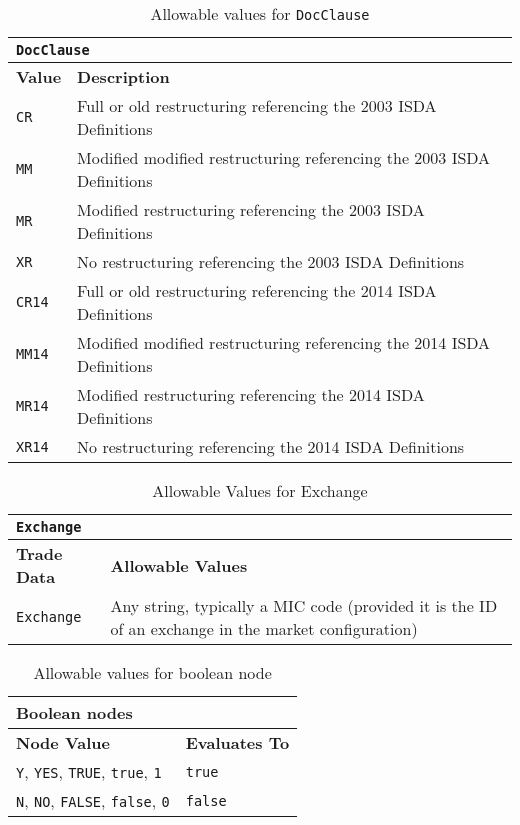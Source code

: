 \begin{table}[H]
\centering
  \begin{tabular} {|p{3cm}|p{12cm}|}
    \hline
    \multicolumn{2}{|l|}{\lstinline!DocClause!} \\
    \hline
    \textbf{Value} & \textbf{Description} \\
    \hline
    \lstinline!CR! & Full or old restructuring referencing the 2003 ISDA Definitions \\
    \hline
    \lstinline!MM! & Modified modified restructuring referencing the 2003 ISDA Definitions \\
    \hline
    \lstinline!MR! & Modified restructuring referencing the 2003 ISDA Definitions \\
    \hline
    \lstinline!XR! & No restructuring referencing the 2003 ISDA Definitions \\
    \hline
    \lstinline!CR14! & Full or old restructuring referencing the 2014 ISDA Definitions \\
    \hline
    \lstinline!MM14! & Modified modified restructuring referencing the 2014 ISDA Definitions \\
    \hline
    \lstinline!MR14! & Modified restructuring referencing the 2014 ISDA Definitions \\
    \hline
    \lstinline!XR14! & No restructuring referencing the 2014 ISDA Definitions \\
    \hline
  \end{tabular}
  \caption{Allowable values for \lstinline!DocClause!}
  \label{tab:docclause_data}
\end{table}

\begin{table}[H]
\centering
  \begin{tabular} {|p{3cm}|p{12cm}|}
    \hline
    \multicolumn{2}{|l|}{\tt Exchange} \\ \hline
    \bfseries{Trade Data} & \bfseries{Allowable Values} \\
    \hline
    \lstinline!Exchange!  & Any string, typically a MIC code (provided it is the ID of an exchange in the market configuration) \\
    \hline
  \end{tabular}
  \caption{Allowable Values for Exchange}
  \label{tab:mic}
\end{table}

\begin{table}[H]
\centering
  \begin{tabular} {|l|l|}
    \hline
    \multicolumn{2}{|l|}{Boolean nodes} \\
    \hline
    \textbf{Node Value} & \textbf{Evaluates To} \\
    \hline
    \lstinline!Y!, \lstinline!YES!, \lstinline!TRUE!, \lstinline!true!, \lstinline!1! & \lstinline!true! \\
    \hline
    \lstinline!N!, \lstinline!NO!, \lstinline!FALSE!, \lstinline!false!, \lstinline!0! & \lstinline!false! \\
    \hline
  \end{tabular}
  \caption{Allowable values for boolean node}
  \label{tab:boolean_allowable}
\end{table}

